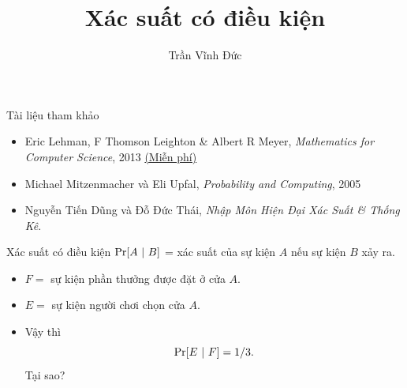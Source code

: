 %


\title{Xác suất có điều kiện} 
 \author{Trần Vĩnh Đức}
     
\maketitle

\begin{frame}{Tài liệu tham khảo}
  \begin{itemize}
  \item Eric Lehman, F Thomson Leighton \& Albert R Meyer,
    \textit{Mathematics for Computer Science}, 2013
    \href{https://www.seas.harvard.edu/courses/cs20/MIT6_042Notes.pdf}{\color{blue}(Miễn
    phí)}
  \item Michael Mitzenmacher và Eli Upfal, \textit{Probability and Computing}, 2005
  \item  Nguyễn Tiến Dũng và Đỗ Đức Thái, \textit{Nhập Môn Hiện Đại Xác Suất \& Thống Kê}.
  \end{itemize}
\end{frame}

\begin{frame}
  \begin{block}{Xác suất có điều kiện}
    $\pr[A\ |\  B]$ = xác suất của sự kiện $A$ nếu  sự kiện $B$ xảy ra.
  \end{block}
\begin{xmpl}
  \begin{itemize}
  \item $F =$ sự kiện phần thưởng được đặt ở cửa $A$.
  \item $E  =$ sự kiện người chơi chọn cửa $A$.
  \item Vậy thì 
    $$
    \mathrm{Pr} [E \ | \ F] = 1/3. 
    $$
Tại sao?
  \end{itemize}
\end{xmpl}
\end{frame}

